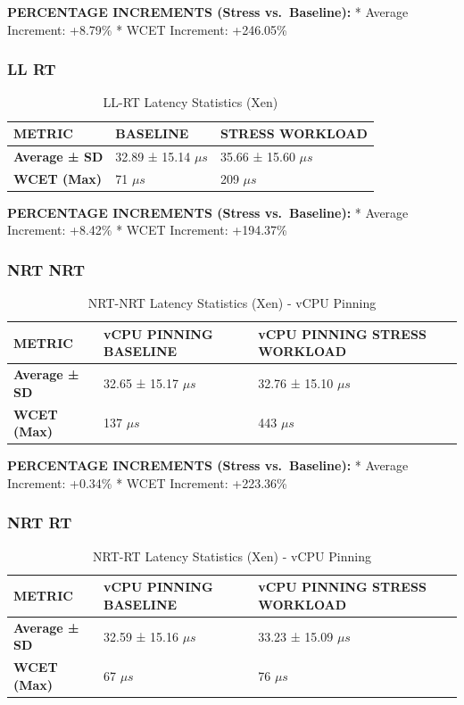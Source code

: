 \textbf{PERCENTAGE INCREMENTS (Stress vs.~Baseline):} * Average
Increment: +8.79\% * WCET Increment: +246.05\%

\subsubsection{LL RT}\label{ll-rt}

\begin{table}
\centering
\caption{LL-RT Latency Statistics (Xen)}
\label{tab:xen:ll-rt}
\begin{tabularx}{\linewidth}{@{}YYY@{}}
\toprule
METRIC & BASELINE & STRESS WORKLOAD\tabularnewline
\midrule
\textbf{Average ± SD} & 32.89 ± 15.14 $\mu s$ & 35.66 ± 15.60 $\mu s$\tabularnewline
\textbf{WCET (Max)} & 71 $\mu s$ & 209 $\mu s$\tabularnewline
\bottomrule
\end{tabularx}
\end{table}

\textbf{PERCENTAGE INCREMENTS (Stress vs.~Baseline):} * Average
Increment: +8.42\% * WCET Increment: +194.37\%


\subsubsection{NRT NRT}\label{nrt-nrt-2}

\begin{table}
\centering
\caption{NRT-NRT Latency Statistics (Xen) - vCPU Pinning}
\begin{tabularx}{\linewidth}{@{}YYY@{}}
\toprule
METRIC & vCPU PINNING BASELINE & vCPU PINNING STRESS WORKLOAD\tabularnewline
\midrule
\textbf{Average ± SD} & 32.65 ± 15.17 $\mu s$ & 32.76 ± 15.10 $\mu s$\tabularnewline
\textbf{WCET (Max)} & 137 $\mu s$ & 443 $\mu s$\tabularnewline
\bottomrule
\end{tabularx}
\end{table}

\textbf{PERCENTAGE INCREMENTS (Stress vs.~Baseline):} * Average
Increment: +0.34\% * WCET Increment: +223.36\%

\subsubsection{NRT RT}\label{nrt-rt-2}

\begin{table}
\centering
\caption{NRT-RT Latency Statistics (Xen) - vCPU Pinning}
\begin{tabularx}{\linewidth}{@{}YYY@{}}
\toprule
METRIC & vCPU PINNING BASELINE & vCPU PINNING STRESS WORKLOAD\tabularnewline
\midrule
\textbf{Average ± SD} & 32.59 ± 15.16 $\mu s$ & 33.23 ± 15.09 $\mu s$\tabularnewline
\textbf{WCET (Max)} & 67 $\mu s$ & 76 $\mu s$\tabularnewline
\bottomrule
\end{tabularx}
\end{table}


